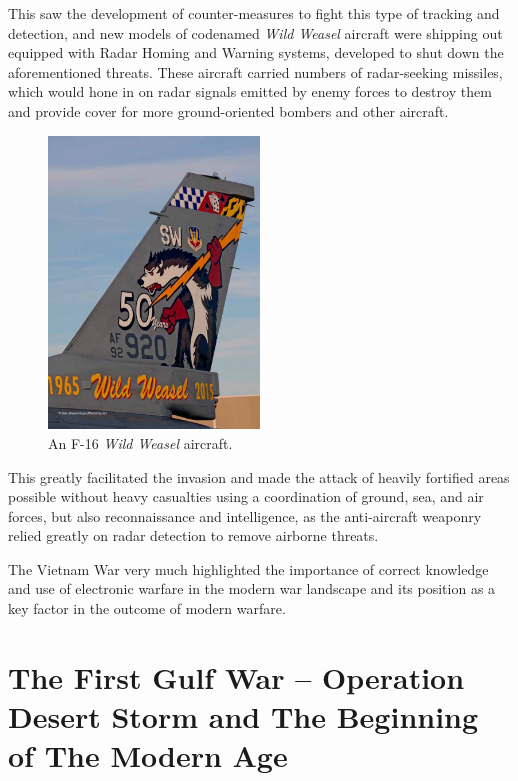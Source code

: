\documentclass[english,purist]{ist-report}
\begin{document}
This saw the development of counter-measures to fight this type of tracking and detection, and new models of codenamed \textit{Wild Weasel} aircraft were shipping out equipped with Radar Homing and Warning systems, developed to shut down the aforementioned threats. These aircraft carried numbers of radar-seeking missiles, which would hone in on radar signals emitted by enemy forces to destroy them and provide cover for more ground-oriented bombers and other aircraft.
\begin{figure}[ht]
    \centering
    \includegraphics[width=0.5\textwidth]{wildweasel}
    \caption{An F-16 \textit{Wild Weasel} aircraft.}
    \label{fig:wildweasel}
\end{figure}

This greatly facilitated the invasion and made the attack of heavily fortified areas possible without heavy casualties using a coordination of ground, sea, and air forces, but also reconnaissance and intelligence, as the anti-aircraft weaponry relied greatly on radar detection to remove airborne threats.

The Vietnam War very much highlighted the importance of correct knowledge and use of electronic warfare in the modern war landscape and its position as a key factor in the outcome of modern warfare.

\section{The First Gulf War -- Operation Desert Storm and The Beginning of The Modern Age}
\end{document}
